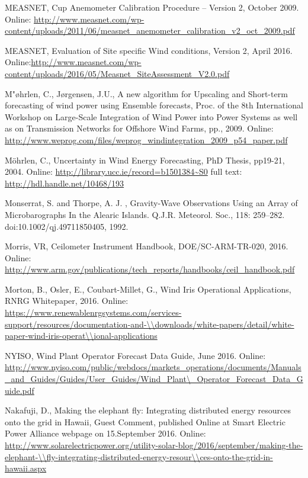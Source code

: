 MEASNET, Cup Anemometer Calibration Procedure – Version 2, October 2009.
Online: \url{http://www.measnet.com/wp-content/uploads/2011/06/measnet_anemometer_calibration_v2_oct_2009.pdf}


MEASNET, Evaluation of Site specific Wind conditions, Version 2, April 2016. 
Online:\url{http://www.measnet.com/wp-content/uploads/2016/05/Measnet_SiteAssessment_V2.0.pdf}


M{"\o}hrlen, C., J{\o}rgensen, J.U., A new algorithm for Upscaling and Short-term forecasting of wind power using Ensemble forecasts, Proc. of the 8th International Workshop on Large-Scale Integration of Wind Power into Power Systems as well as on Transmission Networks for Offshore Wind Farms, pp., 2009.                          
Online: \url{http://www.weprog.com/files/weprog_windintegration_2009_p54_paper.pdf}


M{\"o}hrlen, C., Uncertainty in Wind Energy Forecasting, PhD Thesis, pp19-21, 2004.
Online: \url{http://library.ucc.ie/record=b1501384~S0} full text: \url{http://hdl.handle.net/10468/193} 

Monserrat, S. and Thorpe, A. J. , Gravity-Wave Observations Using an Array of Microbarographs In the Alearic Islands. Q.J.R. Meteorol. Soc., 118: 259–282. doi:10.1002/qj.49711850405, 1992.


Morris, VR, Ceilometer Instrument Handbook, DOE/SC-ARM-TR-020, 2016.      Online: \url{http://www.arm.gov/publications/tech_reports/handbooks/ceil_handbook.pdf}

Morton, B., Osler, E., Coubart-Millet, G., Wind Iris Operational Applications, RNRG Whitepaper, 2016.
Online: \small{\url{https://www.renewablenrgsystems.com/services-support/resources/documentation-and-\\downloads/white-papers/detail/white-paper-wind-iris-operat\\ional-applications}}

NYISO, Wind Plant Operator Forecast Data Guide, June 2016. 	Online: \small{\url{http://www.nyiso.com/public/webdocs/markets_operations/documents/Manuals_and_Guides/Guides/User_Guides/Wind_Plant\\_Operator_Forecast_Data_Guide.pdf}}


Nakafuji, D., Making the elephant fly: Integrating distributed energy resources onto the grid in Hawaii, Guest Comment, published Online at Smart Electric Power Alliance webpage on 15.September 2016.
Online: \small{\url{http://www.solarelectricpower.org/utility-solar-blog/2016/september/making-the-elephant-\\fly-integrating-distributed-energy-resour\\ces-onto-the-grid-in-hawaii.aspx}}


